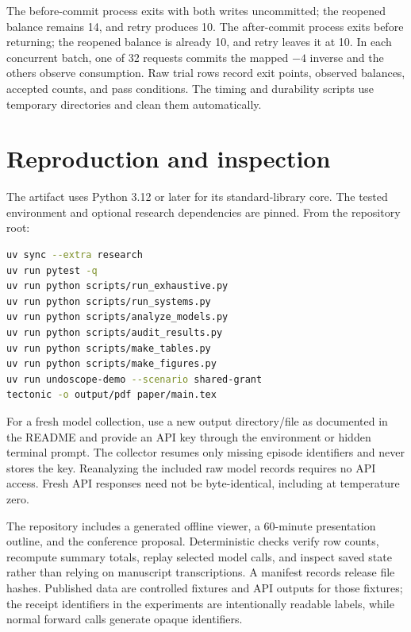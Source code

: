 \documentclass[10pt,twocolumn]{article}
\begin{document}
The before-commit process exits with both writes uncommitted; the reopened balance remains 14, and retry produces 10. The after-commit process exits before returning; the reopened balance is already 10, and retry leaves it at 10. In each concurrent batch, one of 32 requests commits the mapped $-4$ inverse and the others observe consumption. Raw trial rows record exit points, observed balances, accepted counts, and pass conditions. The timing and durability scripts use temporary directories and clean them automatically.

\balance
\section{Reproduction and inspection}\label{app:reproduce}
The artifact uses Python 3.12 or later for its standard-library core. The tested environment and optional research dependencies are pinned. From the repository root:
\begin{lstlisting}[language=bash]
uv sync --extra research
uv run pytest -q
uv run python scripts/run_exhaustive.py
uv run python scripts/run_systems.py
uv run python scripts/analyze_models.py
uv run python scripts/audit_results.py
uv run python scripts/make_tables.py
uv run python scripts/make_figures.py
uv run undoscope-demo --scenario shared-grant
tectonic -o output/pdf paper/main.tex
\end{lstlisting}
For a fresh model collection, use a new output directory/file as documented in the README and provide an API key through the environment or hidden terminal prompt. The collector resumes only missing episode identifiers and never stores the key. Reanalyzing the included raw model records requires no API access. Fresh API responses need not be byte-identical, including at temperature zero.

The repository includes a generated offline viewer, a 60-minute presentation outline, and the conference proposal. Deterministic checks verify row counts, recompute summary totals, replay selected model calls, and inspect saved state rather than relying on manuscript transcriptions. A manifest records release file hashes. Published data are controlled fixtures and API outputs for those fixtures; the receipt identifiers in the experiments are intentionally readable labels, while normal forward calls generate opaque identifiers.
\end{document}
